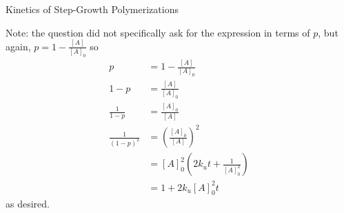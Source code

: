 \begin{activity}{Kinetics of Step-Growth Polymerizations}
\begin{exercises}
\begin{solution}
{						Note: the question did not specifically ask for the expression in terms of $p$, but again, $p=1-\frac{[A]}{[A]_0}$ so
						\begin{align*}
							p &= 1-\frac{[A]}{[A]_0} \\
							1-p &= \frac{[A]}{[A]_0} \\
							\frac{1}{1-p} &= \frac{[A]_0}{[A]}\\
							\frac{1}{(1-p)^2} &= \left(\frac{[A]_0}{[A]}\right)^2\\
							 &= [A]_0^2\left(2k_u t + \frac{1}{[A]_0^2}\right)\\
								&= 1+ 2k_u[A]_0^2 t
						\end{align*}
						as desired.
					}\end{solution}
				
			
		
		
\end{exercises}
	
\end{activity}